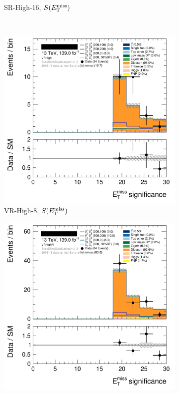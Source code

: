 \begin{figure}[tp]
\begin{subfigure}{0.48\textwidth}
\caption{SR-High-16, $S(E_\mathrm{T}^\mathrm{miss})$}
\end{subfigure}
\\[0.5em]
\begin{subfigure}{0.48\textwidth}
\centering
\includegraphics[width=\textwidth]{figures/2ljets_def_met_Sign_VRHigh.png}
\caption{VR-High-8, $S(E_\mathrm{T}^\mathrm{miss})$}
\end{subfigure}
\hfill
\begin{subfigure}{0.48\textwidth}
\centering
\includegraphics[width=\textwidth]{figures/2ljets_def_met_Sign_VRHighR.png}

\end{subfigure}
\end{figure}
